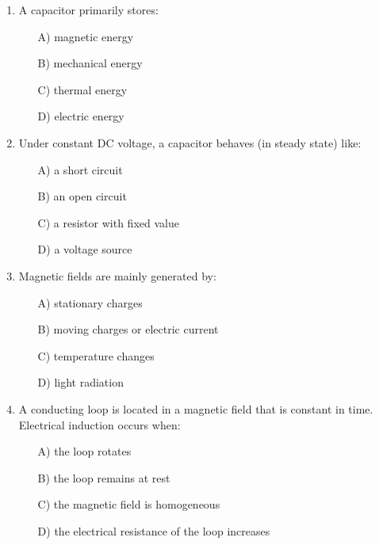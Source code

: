 \documentclass[a4paper,12pt]{article}
\newif\ifshowsolutions
\begin{document}
\begin{enumerate}[label=\textbf{\arabic*.}, leftmargin=*, itemsep=8pt]
\ifshowsolutions
Solution: B
\fi

  \item A capacitor primarily stores:
    \begin{itemize}[label=$\square$]
      \item[A)] magnetic energy
      \item[B)] mechanical energy
      \item[C)] thermal energy
      \item[D)] electric energy
    \end{itemize}

\ifshowsolutions
Solution: D
\fi

  \item Under constant DC voltage, a capacitor behaves (in steady state) like:
    \begin{itemize}[label=$\square$]
      \item[A)] a short circuit
      \item[B)] an open circuit
      \item[C)] a resistor with fixed value
      \item[D)] a voltage source
    \end{itemize}

\ifshowsolutions
Solution: B
\fi

  \item Magnetic fields are mainly generated by:
    \begin{itemize}[label=$\square$]
      \item[A)] stationary charges
      \item[B)] moving charges or electric current
      \item[C)] temperature changes
      \item[D)] light radiation
    \end{itemize}

\ifshowsolutions
Solution: B
\fi

  \item A conducting loop is located in a magnetic field that is constant in time. Electrical induction occurs when:
    \begin{itemize}[label=$\square$]
      \item[A)] the loop rotates
      \item[B)] the loop remains at rest
      \item[C)] the magnetic field is homogeneous
      \item[D)] the electrical resistance of the loop increases
    \end{itemize}


\end{enumerate}
\end{document}
